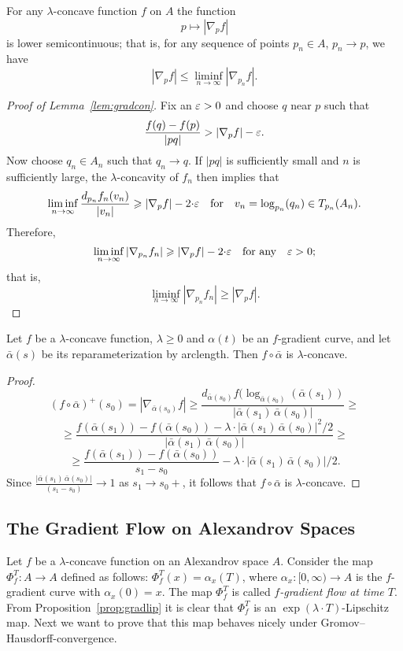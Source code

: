 \documentclass{amsart}
\begin{document}
\begin{cor}\label{cor:gradlim} 
For any $\lambda$-concave function $f$ on $A$
the function 
$$p\mapsto|\nabla_pf|$$ 
is lower semicontinuous;
that is, for any sequence of points $p_n\in A$, $p_n\to p$, we have
$$|\nabla_p f|\le \liminf_{n\to \infty} |\nabla_{p_n} f|.$$

\end{cor}

\begin{proof}[Proof of Lemma~\ref{lem:gradcon}] Fix an $\varepsilon>0$ and choose $q$ near $p$ such
that
$$\frac{f(q)-f(p)}{|pq|}> |\nabla_p f|-\varepsilon.$$
Now choose $q_n\in A_n$ such that $q_n\to q$.
If $|pq|$ is sufficiently small and $n$ is
sufficiently large,  the $\lambda$-concavity of $f_n$ then implies that
$$\liminf_{n\to \infty}\frac{d_{p_n}f_n(v_n)}{|v_n|}\geqslant |\nabla_p f|-2{\cdot} \varepsilon
\quad\text{for}\quad 
v_n=\log_{p_n}(q_n)\in T_{p_n}(A_n).$$
Therefore,
$$\liminf_{n\to \infty} |\nabla_{p_n} f_n|\geqslant
|\nabla_p f|-2{\cdot} \varepsilon
\quad\text{for any}\quad
\varepsilon>0;$$
that is,
$$\liminf_{n\to \infty} |\nabla_{p_n} f_n|\ge
|\nabla_p f|. $$
\end{proof}

\begin{lem}\label{lem:concave}Let $f$ be a $\lambda$-concave function,  $\lambda\ge 0$ and $\alpha(t)$ be an $f$-gradient curve, and let $\bar\alpha(s)$ be its reparameterization by arclength. Then $f\circ\bar\alpha$ is  $\lambda$-concave.
\end{lem}

\begin{proof}

$$(f\circ\bar\alpha)^+(s_0)=|\nabla_{\bar\alpha(s_0)}f|
\ge
 \frac{d_{\bar\alpha(s_0)}f(\log_{\bar\alpha(s_0)}(\bar\alpha(s_1))}
 { |\bar\alpha(s_1)\,\bar\alpha(s_0)|}
 \ge$$
$$
\ge\frac{f(\bar\alpha(s_1))-f(\bar\alpha(s_0))
-
\lambda{\cdot}  |\bar\alpha(s_1)\,\bar\alpha(s_0)|^2/2 }{|\bar\alpha(s_1)\,\bar\alpha(s_0)|}
\ge $$
$$\ge
\frac{f(\bar\alpha(s_1))-f(\bar\alpha(s_0))}{ s_1-s_0}
-
\lambda{\cdot} |\bar\alpha(s_1)\,\bar\alpha(s_0)|/2.$$
Since $\frac{|\bar\alpha(s_1)\,\bar\alpha(s_0)|}{(s_1-s_0)}\to 1$
 as $s_1\to s_0+$, it follows that $f\circ\bar\alpha$ is  $\lambda$-concave.

\end{proof}





\subsection{ The Gradient Flow on Alexandrov Spaces}
Let $f$ be a $\lambda$-concave function on an Alexandrov space $A$.
Consider the map $\Phi_f^T\colon A\to A$ defined as follows:
$\Phi_f^T(x)=\alpha_x(T)$, where $\alpha_x\colon [0,\infty)\to A$ is the $f$-gradient curve with $\alpha_x(0)=x$.
The map $\Phi_f^T$ is called
\emph{$f$-gradient flow at time $T$}. From Proposition~\ref{prop:gradlip}  it is clear that  $\Phi_f^T$ is an $\exp(\lambda{\cdot}  T)$-Lipschitz map. Next we want to prove that this map behaves nicely under Gromov--Hausdorff-convergence.
\end{document}
